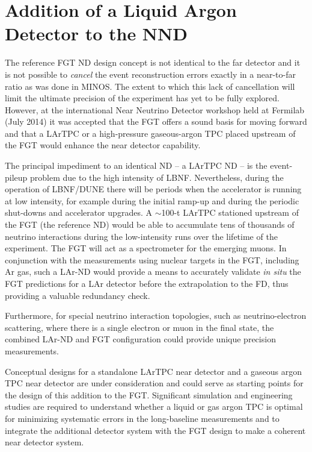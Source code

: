 \section{Addition of a Liquid Argon Detector to the NND}
\label{sec:detectors-nd-alt}

The reference FGT ND design concept is not
identical to the far detector and it is not possible
to \textit{cancel} the event reconstruction errors exactly in a near-to-far
ratio as was done in MINOS.  The extent to which this lack of
cancellation will limit the ultimate precision of the experiment has
yet to be fully explored.  However, at the international Near Neutrino
Detector workshop held at Fermilab (July 2014) it was accepted that
the FGT offers a sound basis for moving forward and that a LArTPC
or a high-pressure gaseous-argon TPC placed upstream of the FGT would
enhance the near detector capability.


The principal impediment to an
identical ND -- a LArTPC ND -- is the event-pileup problem
due to the high intensity of LBNF. Nevertheless, during the operation
of LBNF/DUNE there will be periods when the accelerator is running at
low intensity, for example during the initial ramp-up and during the
periodic shut-downs and accelerator upgrades. A $\sim$100-t LArTPC
stationed upstream of the FGT (the reference ND) would be able to
accumulate tens of thousands of neutrino interactions during the
low-intensity runs over the lifetime of the experiment.  The FGT will
act as a spectrometer for the emerging muons. In conjunction with the
measurements using nuclear targets in the FGT, including Ar gas, such a
LAr-ND would provide a means to accurately validate \textit{in situ} the
FGT predictions for a LAr detector before the extrapolation to the FD,
thus providing a valuable redundancy check.

Furthermore, for special neutrino interaction topologies, such as
neutrino-electron scattering, where there is a single electron or muon
in the final state, the combined LAr-ND and FGT configuration could
provide unique precision measurements.

Conceptual designs for a standalone LArTPC near detector and a
gaseous argon TPC near detector are under consideration and
could serve as starting points for the design of this addition to the
FGT.  Significant simulation and engineering studies are required to
understand whether a liquid or gas argon TPC is optimal for minimizing
systematic errors in the long-baseline measurements and to integrate
the additional detector system with the FGT design to make a coherent
near detector system.

